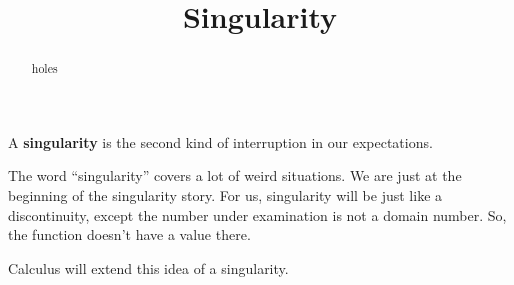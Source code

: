 \documentclass{ximera}
\title{Singularity}
\begin{document}
\begin{abstract}
holes
\end{abstract}
\maketitle











A \textbf{singularity} is the second kind of interruption in our expectations. 

The word ``singularity'' covers a lot of weird situations.  We are just at the beginning of the singularity story.  For us, singularity will be just like a discontinuity, except the number under examination is not a domain number.  So, the function doesn't have a value there.

Calculus will extend this idea of a singularity.
\end{document}
